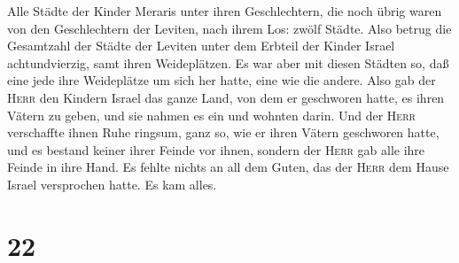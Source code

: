  Alle Städte der Kinder Meraris unter ihren
Geschlechtern, die noch übrig waren von den Geschlechtern der Leviten,
nach ihrem Los: zwölf Städte.  Also betrug die Gesamtzahl
der Städte der Leviten unter dem Erbteil der Kinder Israel
achtundvierzig, samt ihren Weideplätzen.  Es war aber mit
diesen Städten so, daß eine jede ihre Weideplätze um sich her hatte,
eine wie die andere.  Also gab der \textsc{Herr} den
Kindern Israel das ganze Land, von dem er geschworen hatte, es ihren
Vätern zu geben, und sie nahmen es ein und wohnten darin.
 Und der \textsc{Herr} verschaffte ihnen Ruhe ringsum,
ganz so, wie er ihren Vätern geschworen hatte, und es bestand keiner
ihrer Feinde vor ihnen, sondern der \textsc{Herr} gab alle ihre Feinde
in ihre Hand.  Es fehlte nichts an all dem Guten, das der
\textsc{Herr} dem Hause Israel versprochen hatte. Es kam alles.

\hypertarget{section-21}{%
\section{22}\label{section-21}}

